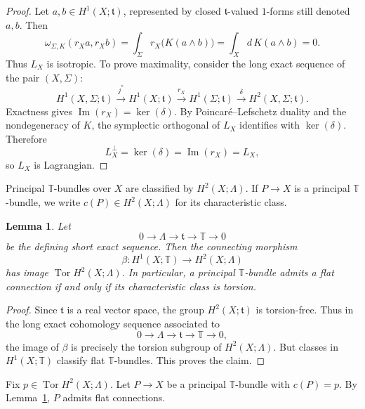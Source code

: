\documentclass[12pt]{amsart}
\numberwithin{equation}{section}
\newtheorem{lemma}[theorem]{Lemma}
\begin{document}
\begin{proof}
Let \(a,b\in H^1(X;\mathfrak t)\), represented by closed \(\mathfrak t\)-valued \(1\)-forms
still denoted \(a,b\). Then
\[
\omega_{\Sigma,K}(r_Xa,r_Xb)
=
\int_\Sigma r_X\bigl(K(a\wedge b)\bigr)
=
\int_X d\,K(a\wedge b)
=
0.
\]
Thus \(L_X\) is isotropic. To prove maximality, consider the long exact sequence of the pair \((X,\Sigma)\):
\[
H^1(X,\Sigma;\mathfrak t)\xrightarrow{j^*}
H^1(X;\mathfrak t)\xrightarrow{r_X}
H^1(\Sigma;\mathfrak t)\xrightarrow{\delta}
H^2(X,\Sigma;\mathfrak t).
\]
Exactness gives \(\operatorname{Im}(r_X)=\ker(\delta)\). By Poincar\'e--Lefschetz duality and
the nondegeneracy of \(K\), the symplectic orthogonal of \(L_X\) identifies with \(\ker(\delta)\).
Therefore
\[
L_X^\perp=\ker(\delta)=\operatorname{Im}(r_X)=L_X,
\]
so \(L_X\) is Lagrangian.
\end{proof}


Principal \(\mathbb T\)-bundles over \(X\) are classified by \(H^2(X;\Lambda)\). If
\(P\to X\) is a principal \(\mathbb T\)-bundle, we write \(c(P)\in H^2(X;\Lambda)\) for its
characteristic class.

\begin{lemma}
\label{lem:torsion-flat-bundles-toral}
Let
\[
0\longrightarrow \Lambda\longrightarrow \mathfrak t\longrightarrow \mathbb T\longrightarrow 0
\]
be the defining short exact sequence. Then the connecting morphism
\[
\beta\colon H^1(X;\mathbb T)\longrightarrow H^2(X;\Lambda)
\]
has image \(\operatorname{Tor}H^2(X;\Lambda)\). In particular, a principal \(\mathbb T\)-bundle
admits a flat connection if and only if its characteristic class is torsion.
\end{lemma}

\begin{proof}
Since \(\mathfrak t\) is a real vector space, the group \(H^2(X;\mathfrak t)\) is torsion-free.
Thus in the long exact cohomology sequence associated to
\[
0\longrightarrow \Lambda\longrightarrow \mathfrak t\longrightarrow \mathbb T\longrightarrow 0,
\]
the image of \(\beta\) is precisely the torsion subgroup of \(H^2(X;\Lambda)\). But classes in
\(H^1(X;\mathbb T)\) classify flat \(\mathbb T\)-bundles. This proves the claim.
\end{proof}

Fix \(p\in \operatorname{Tor}H^2(X;\Lambda)\). Let \(P\to X\) be a principal \(\mathbb T\)-bundle
with \(c(P)=p\). By Lemma~\ref{lem:torsion-flat-bundles-toral}, \(P\) admits flat connections.
\end{document}
